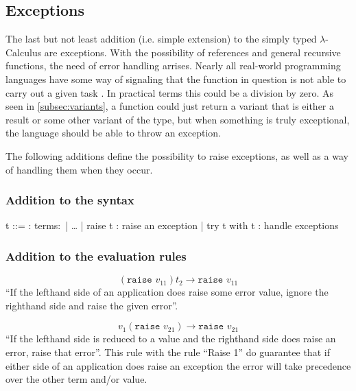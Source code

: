 \subsection{Exceptions}

The last but not least addition (i.e. simple extension) to the
simply typed $\lambda$-Calculus are exceptions. With the possibility
of references and general recursive functions, the need of
error handling arrises. Nearly all real-world programming languages
have some way of signaling that the function in question is not able
to carry out a given task \cite{pierce2002ProgLang}. In practical terms
this could be a division by zero. As seen in \ref{subsec:variants},
a function could just return a variant that is either a result or
some other variant of the type, but when something is truly exceptional,
the language should be able to throw an exception.

The following additions define the possibility to raise exceptions,
as well as a way of handling them when they occur.

\subsubsection{Addition to the syntax \cite{pierce2002ProgLang}}
\begin{bnfgrammar}
    t ::= : terms$\colon$
    | \dots
    | raise t : raise an exception
    | try t with t : handle exceptions
\end{bnfgrammar}\leavevmode\newline

\subsubsection{Addition to the evaluation rules \cite{pierce2002ProgLang}}
\begin{equation*}
    \tag{Application Raise 1}
    (\texttt{raise } v_{11}) t_2 \rightarrow \texttt{raise } v_{11}
\end{equation*}
``If the lefthand side of an application does raise some error value,
ignore the righthand side and raise the given error''.

\begin{equation*}
    \tag{Application Raise 2}
    v_1 (\texttt{raise } v_{21}) \rightarrow \texttt{raise } v_{21}
\end{equation*}
``If the lefthand side is reduced to a value and the righthand side does
raise an error, raise that error''. This rule with the rule ``Raise 1''
do guarantee that if either side of an application does raise an exception
the error will take precedence over the other term and/or value.

